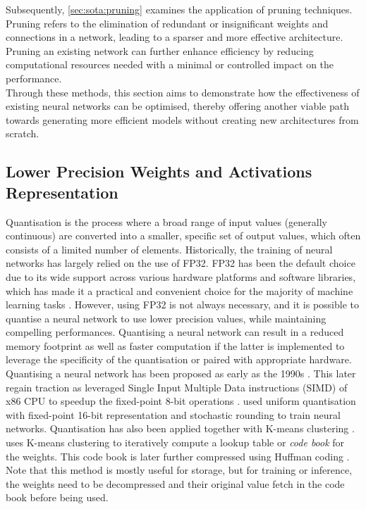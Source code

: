 Subsequently, \cref{sec:sota:pruning} examines the application of
pruning techniques. Pruning refers to the elimination of redundant or
insignificant weights and connections in a network, leading to a sparser and
more effective architecture. Pruning an existing network can further enhance
efficiency by reducing computational resources needed with a minimal or
controlled impact on the performance.\\

Through these methods, this section aims to demonstrate how the effectiveness of
existing neural networks can be optimised, thereby offering another viable path
towards generating more efficient models without creating new architectures from
scratch.\\

\subsection{Lower Precision Weights and Activations Representation}\label{sec:sota:quantisation}

Quantisation is the process where a broad range of input values (generally
continuous) are converted into a smaller, specific set of output values, which
often consists of a limited number of elements. Historically, the training of
neural networks has largely relied on the use of \ac{FP32}. FP32 has been the
default choice due to its wide support across various hardware platforms and
software libraries, which has made it a practical and convenient choice for the
majority of machine learning tasks \cite{sze2017efficient}. However, using
\acl{FP32} is not always necessary, and it is possible to quantise a neural
network to use lower precision values, while maintaining compelling
performances. Quantising a neural network can result in a reduced memory
footprint as well as faster computation if the latter is implemented to leverage
the specificity of the quantisation or paired with appropriate hardware.\\

Quantising a neural network has been proposed as early as the 1990s
\cite{balzer1991weight,fiesler1990weight}. This later regain traction as
\citeauthor{37631} leveraged Single Input Multiple Data instructions (SIMD) of
x86 \ac{CPU} to speedup the fixed-point 8-bit operations \cite{37631}.
\citeauthor{gupta2015deep} used uniform quantisation with fixed-point 16-bit
representation and stochastic rounding to train neural networks. Quantisation
has also been applied together with K-means clustering
\cite{steinhaus1956division}. \cite{DBLP:journals/corr/HanMD15} uses K-means
clustering to iteratively compute a lookup table or \emph{code book} for the
weights. This code book is later further compressed using Huffman coding
\cite{huffman1952method}. Note that this method is mostly useful for storage,
but for training or inference, the weights need to be decompressed and their
original value fetch in the code book before being used.\\

